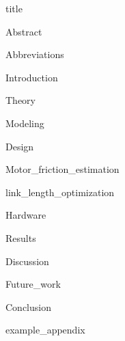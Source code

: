 \documentclass{article}
\begin{document}
{title}

\frontmatter

{Abstract}


\newpage
\tableofcontents

\listoffigures
\listoftables

\mainmatter

{Abbreviations}

{Introduction}
\newpage

{Theory}

{Modeling}

{Design}

{Motor_friction_estimation}

{link_length_optimization}

{Hardware}


{Results}

{Discussion}

{Future_work}

{Conclusion}


\newpage
\printbibliography[heading = bibintoc, title = Bibliography]    %

\addappendix
{example_appendix}

\end{document}
